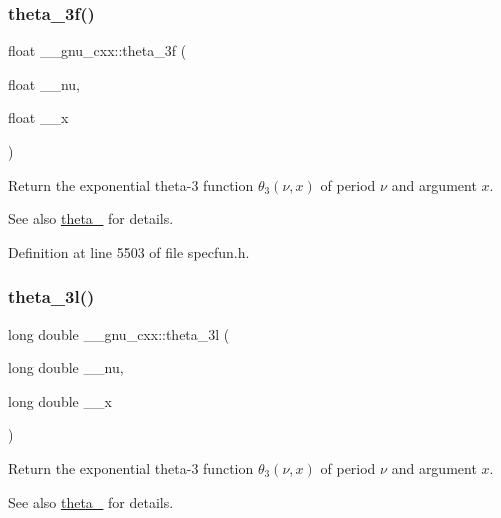 \subsubsection{\texorpdfstring{theta\+\_\+3f()}{theta\_3f()}}
{\footnotesize\ttfamily float \+\_\+\+\_\+gnu\+\_\+cxx\+::theta\+\_\+3f (\begin{DoxyParamCaption}\item[{float}]{\+\_\+\+\_\+nu,  }\item[{float}]{\+\_\+\+\_\+x }\end{DoxyParamCaption})\hspace{0.3cm}{\ttfamily [inline]}}

Return the exponential theta-\/3 function $ \theta_3(\nu,x) $ of period $ \nu $ and argument $ x $.

\begin{DoxySeeAlso}{See also}
\hyperlink{group__gnu__math__spec__func_ga146c3b8e86991e164d4bf143cda5f0fc}{theta\+\_} for details. 
\end{DoxySeeAlso}


Definition at line 5503 of file specfun.\+h.

\mbox{\label{group__gnu__math__spec__func_gaf88874ff6c69940d2191f7947d2ea119}} 
\subsubsection{\texorpdfstring{theta\+\_\+3l()}{theta\_3l()}}
{\footnotesize\ttfamily long double \+\_\+\+\_\+gnu\+\_\+cxx\+::theta\+\_\+3l (\begin{DoxyParamCaption}\item[{long double}]{\+\_\+\+\_\+nu,  }\item[{long double}]{\+\_\+\+\_\+x }\end{DoxyParamCaption})\hspace{0.3cm}{\ttfamily [inline]}}

Return the exponential theta-\/3 function $ \theta_3(\nu,x) $ of period $ \nu $ and argument $ x $.

\begin{DoxySeeAlso}{See also}
\hyperlink{group__gnu__math__spec__func_ga146c3b8e86991e164d4bf143cda5f0fc}{theta\+\_} for details. 
\end{DoxySeeAlso}



